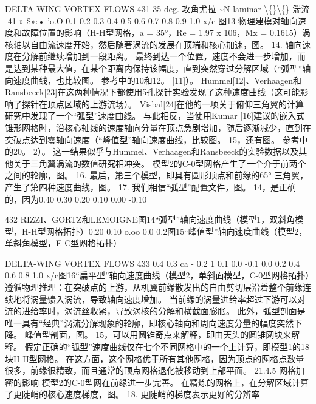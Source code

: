 \documentclass[UTF8,11pt,a4paper,openany,fontset=fandol]{ctexbook}
\begin{document}
DELTA-WING VORTEX FLOWS 431 35 deg. 攻角尤拉 \textasciitilde{}N laminar \textbackslash\{\}\textbackslash\{\} 湍流 -41 »-\$»:• 'o.O 0.1 0.2 0.3 0.4 0.5 0.6 0.7 0.8 0.9 1.0 x/c 图13 物理建模对轴向速度和故障位置的影响（H-H型网格，a = 35°，Re = 1.97 x 106，Mx = 0.1615）涡核轴以自由流速度开始，然后随著涡流的发展在顶端和核心加速，图。 14. 轴向速度在分解前继续增加到一段距离。 最终到达一个位置，速度不会进一步增加，而是达到某种最大值，在某个距离内保持该幅度，直到突然穿过分解区域（“弧型”轴向速度曲线，也比较图。 参考中的10和12。 [11]）。 Hummel[12]、Verhaagen和Ransbeeck[23]在这两种情况下都使用5孔探针实验发现了这种速度曲线（这可能影响了探针在顶点区域的上游流场）。 Visbal[24]在他的一项关于俯仰三角翼的计算研究中发现了一个“弧型”速度曲线。 与此相反，当使用Kumar [16]建议的嵌入式锥形网格时，沿核心轴线的速度轴向分量在顶点急剧增加，随后逐渐减少，直到在突破点达到零轴向速度（“峰值型”轴向速度曲线，比较图。 15，还有图。 参考中的20。 2）。 这一结果似乎与Hummel、Verhaagen和Ransbeeck的实验数据以及其他关于三角翼涡流的数值研究相冲突。 模型2的C-0型网格产生了一个介于前两个之间的轮廓，图。 16. 最后，第三个模型，即具有圆形顶点和前缘的65° 三角翼，产生了第四种速度曲线，图。 17. 我们相信“弧型”配置文件，图。 14，是正确的，因为0.40 0.30 0.20 0.10 0.00 -0.10

432 RIZZI、GORTZ和LEMOIGNE图14“弧型”轴向速度曲线（模型1，双斜角模型，H-H型网格拓扑）0.20 0.10 o.oo 0.0 0.2图15“峰值型”轴向速度曲线（模型2，单斜角模型，E-C型网格拓扑）

DELTA-WING VORTEX FLOWS 433 0.4 0.3 ca - 0.2 1 0.1 0.0 -0.1 0.0 0.2 0.4 0.6 0.8 1.0 x/c图16“扁平型”轴向速度曲线（模型2，单斜面模型，C-0型网格拓扑）遵循物理推理：在突破点的上游，从机翼前缘散发出的自由剪切层沿着整个前缘连续地将涡量馈入涡流，导致轴向速度增加。 当前缘的涡量进给率超过下游可以对流的进给率时，涡流丝收紧，导致涡核的分解和横截面膨胀。 此外，弧型剖面是唯一具有“经典”涡流分解现象的轮廓，即核心轴向和周向速度分量的幅度突然下降。 峰值型剖面，图。 15，可以用圆锥奇点来解释，即由天头的圆锥网块来解释。 假定正确的“弧型”速度曲线仅在七个不同网格中的一个上计算，即模型1的18块H-H型网格。 在这方面，这个网格优于所有其他网格，因为顶点的网格点数量很多，前缘很精致，而且通常的顶点网格退化被移动到上部平面。 21.4.5 网格加密的影响 模型2的C-0型网在前缘进一步完善。 在精炼的网格上，在分解区域计算了更陡峭的核心速度梯度，图。 18. 更陡峭的梯度表示更好的分辨率
\end{document}
